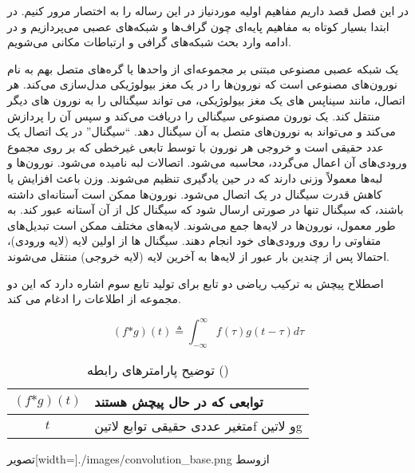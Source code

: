 
در این فصل قصد داریم مفاهیم اولیه موردنیاز در این رساله را به اختصار مرور کنیم.
در ابتدا بسیار کوتاه به مفاهیم پایه‌ای چون گراف‌ها و شبکه‌های عصبی می‌پردازیم و در ادامه وارد
بحث شبکه‌های گرافی و ارتباطات مکانی می‌شویم.

یک شبکه عصبی مصنوعی مبتنی بر مجموعه‌ای از واحدها یا گره‌های متصل بهم به نام نورون‌های مصنوعی است که نورون‌ها را در یک مغز بیولوژیکی مدل‌سازی می‌کند.
هر اتصال، مانند سیناپس های یک مغز بیولوژیکی، می تواند سیگنالی را به نورون های دیگر منتقل کند.
یک نورون مصنوعی سیگنالی را دریافت می‌کند و سپس آن را پردازش می‌کند و می‌تواند به نورون‌های متصل به آن سیگنال دهد.
``سیگنال'' در یک اتصال یک عدد حقیقی است و خروجی هر نورون با توسط تابعی غیرخطی که بر روی مجموع ورودی‌های آن اعمال می‌گردد، محاسبه می‌شود. اتصالات لبه نامیده می‌شود.
نورون‌ها و لبه‌ها معمولاً وزنی دارند که در حین یادگیری تنظیم می‌شوند. وزن باعث افزایش یا کاهش قدرت سیگنال در یک اتصال می‌شود. نورون‌ها ممکن است آستانه‌ای داشته باشند، که سیگنال تنها در صورتی ارسال شود که سیگنال کل از آن آستانه عبور کند.
به طور معمول، نورون‌ها در لایه‌ها جمع می‌شوند. لایه‌های مختلف ممکن است تبدیل‌های متفاوتی را روی ورودی‌های خود انجام دهند.
سیگنال ها از اولین لایه (لایه ورودی)، احتمالا پس از چندین بار عبور از لایه‌ها به آخرین لایه (لایه خروجی) منتقل می‌شوند.

اصطلاح پیچش به ترکیب ریاضی دو تابع برای تولید تابع سوم اشاره دارد که این دو مجموعه از اطلاعات را ادغام می کند.

\begin{equation}
  \label{eq:conv}
(f \text{*} g)(t) \triangleq \int_{-\infty}^\infty f(\tau)g(t - \tau)d\tau
\end{equation}


\begin{table}[h]
  \centering
  \caption{توضیح پارامترهای رابطه ()}
  \begin{tabular}{|c|p{}|}
    \hline
    $(f \text{*} g)(t)$ & توابعی که در حال پیچش هستند \\
    \hline
    $t$ & متغیر عددی حقیقی توابع ‌لاتین{f}  و ‌لاتین{g} \\
    \hline
  \end{tabular}
  \label{tbl:distance}
\end{table}

  ‌تصویر[width=\textwidth]{./images/convolution_base.png}
  ‌ازوسط

